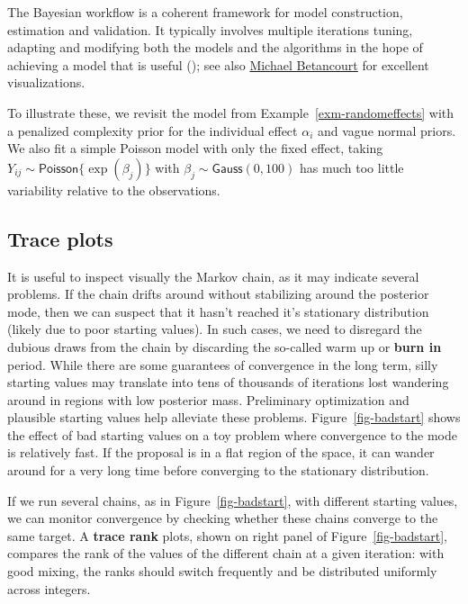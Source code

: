 \documentclass[
  11pt,
  letterpaper,
]{scrbook}
\theoremstyle{definition}
\theoremstyle{definition}
\theoremstyle{definition}
\theoremstyle{plain}
\theoremstyle{plain}
\theoremstyle{remark}
\begin{document}
The Bayesian workflow is a coherent framework for model construction,
estimation and validation. It typically involves multiple iterations
tuning, adapting and modifying both the models and the algorithms in the
hope of achieving a model that is useful
(); see also
\href{https://betanalpha.github.io/assets/case_studies/principled_bayesian_workflow.html}{Michael
Betancourt} for excellent visualizations.

To illustrate these, we revisit the model from
Example~\ref{exm-randomeffects} with a penalized complexity prior for
the individual effect \(\alpha_i\) and vague normal priors. We also fit
a simple Poisson model with only the fixed effect, taking
\(Y_{ij} \sim \mathsf{Poisson}\{\exp(\beta_j)\}\) with
\(\beta_j \sim \mathsf{Gauss}(0,100)\) has much too little variability
relative to the observations.

\subsection{Trace plots}\label{trace-plots}

It is useful to inspect visually the Markov chain, as it may indicate
several problems. If the chain drifts around without stabilizing around
the posterior mode, then we can suspect that it hasn't reached it's
stationary distribution (likely due to poor starting values). In such
cases, we need to disregard the dubious draws from the chain by
discarding the so-called warm up or \textbf{burn in} period. While there
are some guarantees of convergence in the long term, silly starting
values may translate into tens of thousands of iterations lost wandering
around in regions with low posterior mass. Preliminary optimization and
plausible starting values help alleviate these problems.
Figure~\ref{fig-badstart} shows the effect of bad starting values on a
toy problem where convergence to the mode is relatively fast. If the
proposal is in a flat region of the space, it can wander around for a
very long time before converging to the stationary distribution.

If we run several chains, as in Figure~\ref{fig-badstart}, with
different starting values, we can monitor convergence by checking
whether these chains converge to the same target. A \textbf{trace rank}
plots, shown on right panel of Figure~\ref{fig-badstart}, compares the
rank of the values of the different chain at a given iteration: with
good mixing, the ranks should switch frequently and be distributed
uniformly across integers.
\end{document}
